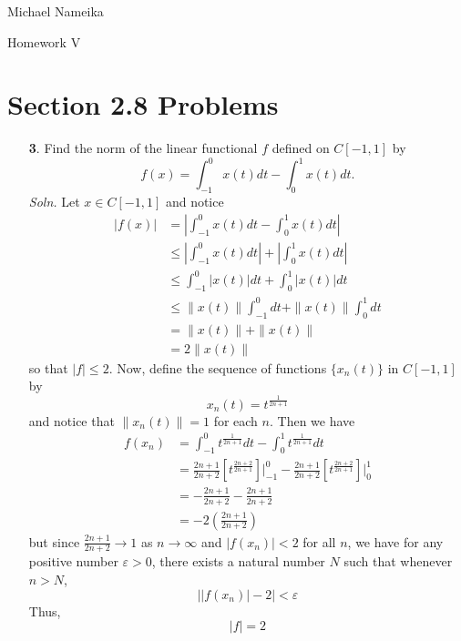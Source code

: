 \documentclass{article}
\begin{document}
\begin{center}
    {\Huge Michael Nameika}
    \vspace{0.5 cm}

    {\huge Homework V}
\end{center}

\section*{Section 2.8 Problems}
\begin{itemize}
    \item[\textbf{3}.] Find the norm of the linear functional $f$ defined on $C[-1,1]$ by 
    \[f(x) = \int_{-1}^0x(t)dt - \int_0^1 x(t)dt.\]
    \textit{Soln.} Let $x \in C[-1,1]$ and notice
    \begin{align*}
        |f(x)| &= \left|\int_{-1}^0x(t)dt - \int_0^1x(t)dt\right|\\
        &\leq \left|\int_{-1}^0x(t)dt\right| + \left|\int_0^1x(t)dt\right|\\
        &\leq \int_{-1}^0|x(t)|dt + \int_0^1 |x(t)|dt\\
        &\leq \|x(t)\|\int_{-1}^0dt + \|x(t)\|\int_0^1dt\\
        &= \|x(t)\| + \|x(t)\|\\
        &= 2\|x(t)\|
    \end{align*}
    so that $|f| \leq 2$. Now, define the sequence of functions $\{x_n(t)\}$ in $C[-1,1]$ by 
    \[x_n(t) = t^{\frac{1}{2n + 1}}\]
    and notice that $\|x_n(t)\| = 1$ for each $n$. Then we have
    \begin{align*}
        f(x_n) &= \int_{-1}^0 t^{\frac{1}{2n + 1}}dt - \int_0^1 t^{\frac{1}{2n + 1}}dt\\
        &= \frac{2n + 1}{2n + 2}\left[t^{\frac{2n+2}{2n+1}}\right]\bigg|_{-1}^0 - \frac{2n + 1}{2n + 2}\left[t^{\frac{2n+2}{2n+1}}\right]\bigg|_0^1\\
        &= -\frac{2n + 1}{2n + 2} - \frac{2n + 1}{2n + 2}\\
        &= -2\left(\frac{2n + 1}{2n + 2}\right)
    \end{align*}
    but since $\frac{2n + 1}{2n + 2} \to 1$ as $n \to \infty$ and $|f(x_n)| < 2$ for all $n$, we have for any positive number $\varepsilon > 0$, there exists a natural number $N$ such that whenever $n > N$,
    \[\left||f(x_n)| - 2\right| < \varepsilon\]
    Thus, 
    \[|f| = 2\]



\end{itemize}
\end{document}
